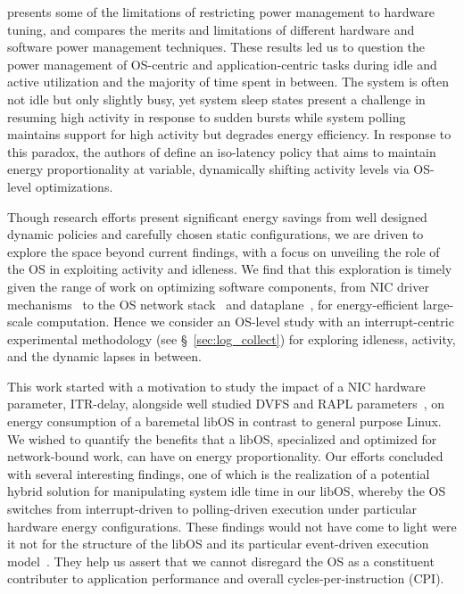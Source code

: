 \cite{oldi-study} presents some of the limitations of
restricting power management to hardware tuning,
and \cite{powercap} compares the merits and limitations of
different hardware and software power management techniques.
These results led us to question
the power management of OS-centric and application-centric tasks
during idle and active utilization
and the majority of time spent in between.
The system is often not idle but only slightly busy,
yet system sleep states present a challenge in
resuming high activity in response to sudden bursts
while system polling maintains support for high activity
but degrades energy efficiency.
In response to this paradox,
the authors of \cite{oldi-pegasus} define an iso-latency policy
that aims to maintain energy proportionality
at variable, dynamically shifting activity levels
via OS-level optimizations.

Though research efforts present significant energy savings
from well designed dynamic policies
and carefully chosen static configurations,
we are driven to explore the space beyond current findings,
with a focus on unveiling the role of the OS
in exploiting activity and idleness.
We find that this exploration is timely
given the range of work on optimizing software components,
from NIC driver mechanisms~\cite{flexnic, affinityaccept, network-latency}
to the OS network stack~\cite{mtcp, sandstorm, network-latency}
and dataplane~\cite{10.1145/299764, 10.1145/2812806},
for energy-efficient large-scale computation.
Hence we consider an OS-level study
with an interrupt-centric experimental methodology (see \S~\ref{sec:log_collect}) 
for exploring idleness, activity, and the dynamic lapses in between.



This work
started with a motivation to study the impact
of a NIC hardware parameter, ITR-delay,
alongside well studied DVFS and RAPL parameters~\cite{rapl2015, rapl2018},
on energy consumption
of a baremetal libOS in contrast to general purpose Linux.
We wished to quantify the benefits that a libOS,
specialized and optimized for network-bound work,
can have on energy proportionality.
Our efforts concluded with several interesting findings,
one of which is the realization of a potential hybrid solution
for manipulating system idle time in our libOS,
whereby the OS switches from interrupt-driven
to polling-driven execution
under particular hardware energy configurations.
These findings would not have come to light
were it not for the structure of the libOS
and its particular event-driven execution model~\cite{seda, unikernels}.
They help us assert that we cannot disregard the OS
as a constituent contributer to application performance and overall cycles-per-instruction (CPI).

